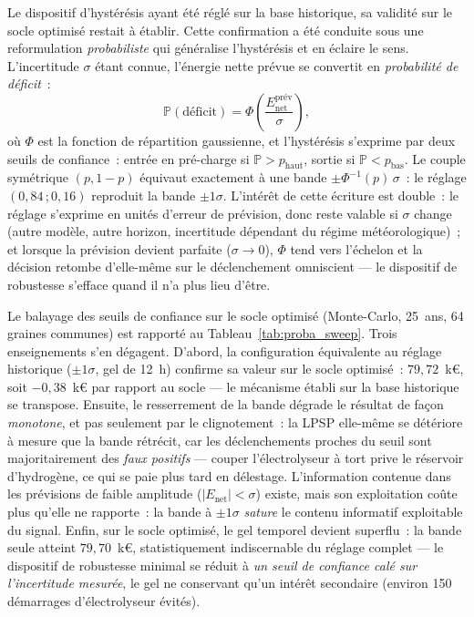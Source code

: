Le dispositif d'hystérésis ayant été réglé sur la base historique, sa validité sur le socle optimisé restait à établir. Cette confirmation a été conduite sous une reformulation \emph{probabiliste} qui généralise l'hystérésis et en éclaire le sens. L'incertitude $\sigma$ étant connue, l'énergie nette prévue se convertit en \emph{probabilité de déficit}~:
\begin{equation}
\label{eq:proba_deficit}
\mathbb{P}(\text{déficit}) = \Phi\!\left(\frac{E_{\text{net}}^{\text{prév}}}{\sigma}\right),
\end{equation}
où $\Phi$ est la fonction de répartition gaussienne, et l'hystérésis s'exprime par deux seuils de confiance~: entrée en pré-charge si $\mathbb{P} > p_{\text{haut}}$, sortie si $\mathbb{P} < p_{\text{bas}}$. Le couple symétrique $(p, 1-p)$ équivaut exactement à une bande $\pm\Phi^{-1}(p)\,\sigma$~: le réglage $(0{,}84\,; 0{,}16)$ reproduit la bande $\pm 1\sigma$. L'intérêt de cette écriture est double~: le réglage s'exprime en unités d'erreur de prévision, donc reste valable si $\sigma$ change (autre modèle, autre horizon, incertitude dépendant du régime météorologique)~; et lorsque la prévision devient parfaite ($\sigma \to 0$), $\Phi$ tend vers l'échelon et la décision retombe d'elle-même sur le déclenchement omniscient — le dispositif de robustesse s'efface quand il n'a plus lieu d'être.

Le balayage des seuils de confiance sur le socle optimisé (Monte-Carlo, 25~ans, 64 graines communes) est rapporté au Tableau~\ref{tab:proba_sweep}. Trois enseignements s'en dégagent. D'abord, la configuration équivalente au réglage historique ($\pm 1\sigma$, gel de \SI{12}{\hour}) confirme sa valeur sur le socle optimisé~: $79{,}72$~k€, soit $-0{,}38$~k€ par rapport au socle — le mécanisme établi sur la base historique se transpose. Ensuite, le resserrement de la bande dégrade le résultat de façon \emph{monotone}, et pas seulement par le clignotement~: la LPSP elle-même se détériore à mesure que la bande rétrécit, car les déclenchements proches du seuil sont majoritairement des \emph{faux positifs} — couper l'électrolyseur à tort prive le réservoir d'hydrogène, ce qui se paie plus tard en délestage. L'information contenue dans les prévisions de faible amplitude ($|E_{\text{net}}| < \sigma$) existe, mais son exploitation coûte plus qu'elle ne rapporte~: la bande à $\pm 1\sigma$ \emph{sature} le contenu informatif exploitable du signal. Enfin, sur le socle optimisé, le gel temporel devient superflu~: la bande seule atteint $79{,}70$~k€, statistiquement indiscernable du réglage complet — le dispositif de robustesse minimal se réduit à \emph{un seuil de confiance calé sur l'incertitude mesurée}, le gel ne conservant qu'un intérêt secondaire (environ 150 démarrages d'électrolyseur évités).


